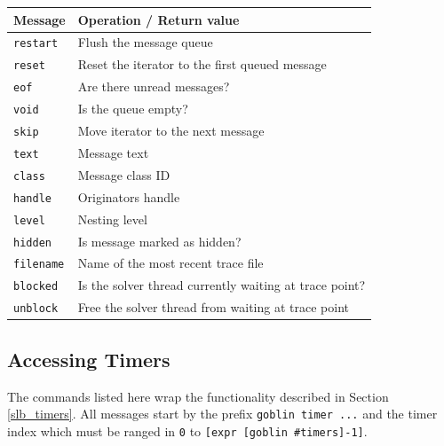 \documentclass[a4paper,11pt,twoside]{book}
\begin{document}
\bigskip
\begin{center}
\begin{tabular}{|p{4.3cm}|p{11cm}|}
\hline
{\bf Message}   & {\bf Operation / Return value} \\
\hline
\hline
\verb/restart/  & Flush the message queue \\
\hline
\verb/reset/    & Reset the iterator to the first queued message \\
\hline
\verb/eof/      & Are there unread messages? \\
\hline
\verb/void/     & Is the queue empty? \\
\hline
\verb/skip/     & Move iterator to the next message \\
\hline
\verb/text/     & Message text \\
\hline
\verb/class/    & Message class ID \\
\hline
\verb/handle/   & Originators handle \\
\hline
\verb/level/    & Nesting level \\
\hline
\verb/hidden/   & Is message marked as hidden? \\
\hline
\verb/filename/ & Name of the most recent trace file \\
\hline
\verb/blocked/  & Is the solver thread currently waiting at trace point? \\
\hline
\verb/unblock/  & Free the solver thread from waiting at trace point \\
\hline
\end{tabular}
\end{center}
\bigskip


\subsection{Accessing Timers}
\label{slb_timer_access}
The commands listed here wrap the functionality described in Section
\ref{slb_timers}. All messages start by the prefix \verb/goblin timer .../
and the timer index which must be ranged in \verb/0/ to
\verb/[expr [goblin #timers]-1]/.
\end{document}
